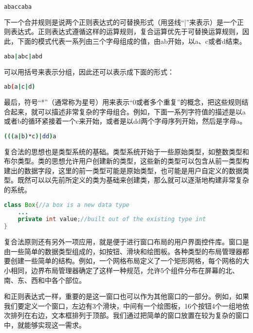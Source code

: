 \begin{lstlisting}[language=bash]
abaccaba
\end{lstlisting}

下一个合并规则是说两个正则表达式的可替换形式（用竖线“|”来表示）是一个正则表达式。正则表达式遵循这样的运算规则，复合运算优先于可替换运算规则，因此，下面的模式代表一系列由三个字母组成的值，由ab开始，以a、c或者d结束。

\begin{lstlisting}[language=bash]
aba|abc|abd
\end{lstlisting}

可以用括号来表示分组，因此还可以表示成下面的形式：

\begin{lstlisting}[language=bash]
ab(a|c|d)
\end{lstlisting}


最后，符号“*”（通常称为星号）用来表示“0或者多个重复”的概念，把这些规则结合起来，就可以描述非常复杂的字母组合。例如，下面一系列字符值的描述是以a或者b的循环紧接着一个c来开始，或者是以dd两个字母序列开始，然后是字母a。

\begin{lstlisting}[language=bash]
(((a|b)*c)|dd)a
\end{lstlisting}

复合法的思想也是类型系统的基础。类型系统开始于一些原始类型，如整数类型和布尔类型。类的思想允许用户创建新的类型，这些新的类型可以包含从前一类型构建出的数据字段，这里的前一类型可能是原始类型，也可能是用户自定义的数据类型。既然可以以先前所定义的类为基础来创建类，那么就可以逐渐地构建非常复杂的系统。


\begin{lstlisting}[language=Java]
class Box{//a box is a new data type
	...
	private int value;//built out of the existing type int
}
\end{lstlisting}



复合法原则还有另外一项应用，就是便于进行窗口布局的用户界面控件库。窗口是由一些简单的数据类型组成的，如按钮、滑块和绘图板。各种类型的布局管理器都要创建一些简单的结构。例如，一个网格布局定义了一个矩形网格，每个网格的大小相同，边界布局管理器确定了这样一种规范，允许5个组件分布在屏幕的北、南、东、西和中各个部位。

和正则表达式一样，重要的是这一窗口也可以作为其他窗口的一部分。例如，如果我们要定义一个窗口，左边有3个滑块，中间有一个绘图板，16个按钮4个一组地依次排列在右边，文本框排列于顶部。我们通过把简单的窗口放置在较为复杂的窗口中，就能够实现这一需求。


